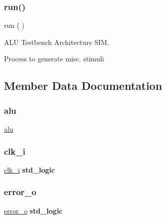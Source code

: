 \subsubsection{\texorpdfstring{run()}{run()}}
{\footnotesize\ttfamily  {\bfseries \textcolor{vhdlchar}{ }} run ( ) \hspace{0.3cm}{\ttfamily [Process]}}



A\+LU Testbench Architecture S\+IM. 

Process to generate misc. stimuli 

\subsection{Member Data Documentation}
\mbox{\label{classtb__alu_1_1sim_a205ce47b385f0dede25ae06417988605}} 
\subsubsection{\texorpdfstring{alu}{alu}}
{\footnotesize\ttfamily \hyperlink{classtb__alu_1_1sim_a205ce47b385f0dede25ae06417988605}{alu} {\bfseries \textcolor{vhdlchar}{ }} \hspace{0.3cm}{\ttfamily [Component]}}

\mbox{\label{classtb__alu_1_1sim_a51bcb92d1464ea7874528ced3e160ff1}} 
\subsubsection{\texorpdfstring{clk\+\_\+i}{clk\_i}}
{\footnotesize\ttfamily \hyperlink{classtb__alu_1_1sim_a51bcb92d1464ea7874528ced3e160ff1}{clk\+\_\+i} {\bfseries \textcolor{comment}{std\+\_\+logic}\textcolor{vhdlchar}{ }} \hspace{0.3cm}{\ttfamily [Signal]}}

\mbox{\label{classtb__alu_1_1sim_aea39ae165b49f7a12978d9290d22ff85}} 
\subsubsection{\texorpdfstring{error\+\_\+o}{error\_o}}
{\footnotesize\ttfamily \hyperlink{classtb__alu_1_1sim_aea39ae165b49f7a12978d9290d22ff85}{error\+\_\+o} {\bfseries \textcolor{comment}{std\+\_\+logic}\textcolor{vhdlchar}{ }} \hspace{0.3cm}{\ttfamily [Signal]}}

